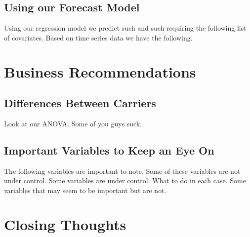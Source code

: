 \documentclass[12pt, a4paper]{book}
\newcommand\tab[1][1cm]{\hspace*{#1}}
\begin{document}
	\section{Using our Forecast Model}
	\tab Using our regression  model we predict  such and such requiring the following list of covariates. Based on time series data we have the following.
\chapter{Business Recommendations}
	\section{Differences Between Carriers}
	\tab Look at our ANOVA. Some of you guys suck.
	\section{Important Variables to Keep an Eye On}
	\tab The following variables are important to note. Some of these variables are not under control. Some variables are under control. What to do in each case. Some variables that may seem to be important but are not.
\chapter{Closing Thoughts}
\end{document}
